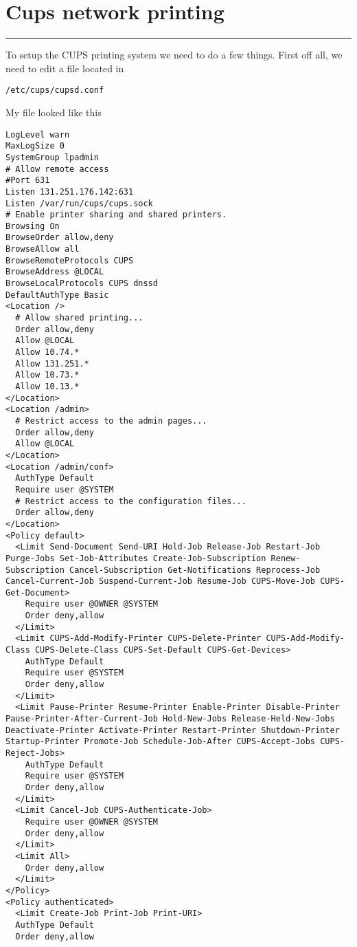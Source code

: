 \documentclass[a4paper, 10pt]{article}
\newcommand{\mytoprule}{\hrule\vspace{4mm}}
\begin{document}
\vspace{10mm}
\section*{Cups network printing}
\mytoprule

To setup the CUPS printing system we need to do a few things. First off all, we need to edit a file located in 
\begin{verbatim}
/etc/cups/cupsd.conf
\end{verbatim}

My file looked like this
\begin{verbatim}
LogLevel warn
MaxLogSize 0
SystemGroup lpadmin
# Allow remote access
#Port 631
Listen 131.251.176.142:631
Listen /var/run/cups/cups.sock
# Enable printer sharing and shared printers.
Browsing On
BrowseOrder allow,deny
BrowseAllow all
BrowseRemoteProtocols CUPS
BrowseAddress @LOCAL
BrowseLocalProtocols CUPS dnssd
DefaultAuthType Basic
<Location />
  # Allow shared printing...
  Order allow,deny
  Allow @LOCAL
  Allow 10.74.*
  Allow 131.251.*
  Allow 10.73.*
  Allow 10.13.*
</Location>
<Location /admin>
  # Restrict access to the admin pages...
  Order allow,deny
  Allow @LOCAL
</Location>
<Location /admin/conf>
  AuthType Default
  Require user @SYSTEM
  # Restrict access to the configuration files...
  Order allow,deny
</Location>
<Policy default>
  <Limit Send-Document Send-URI Hold-Job Release-Job Restart-Job Purge-Jobs Set-Job-Attributes Create-Job-Subscription Renew-Subscription Cancel-Subscription Get-Notifications Reprocess-Job Cancel-Current-Job Suspend-Current-Job Resume-Job CUPS-Move-Job CUPS-Get-Document>
    Require user @OWNER @SYSTEM
    Order deny,allow
  </Limit>
  <Limit CUPS-Add-Modify-Printer CUPS-Delete-Printer CUPS-Add-Modify-Class CUPS-Delete-Class CUPS-Set-Default CUPS-Get-Devices>
    AuthType Default
    Require user @SYSTEM
    Order deny,allow
  </Limit>
  <Limit Pause-Printer Resume-Printer Enable-Printer Disable-Printer Pause-Printer-After-Current-Job Hold-New-Jobs Release-Held-New-Jobs Deactivate-Printer Activate-Printer Restart-Printer Shutdown-Printer Startup-Printer Promote-Job Schedule-Job-After CUPS-Accept-Jobs CUPS-Reject-Jobs>
    AuthType Default
    Require user @SYSTEM
    Order deny,allow
  </Limit>
  <Limit Cancel-Job CUPS-Authenticate-Job>
    Require user @OWNER @SYSTEM
    Order deny,allow
  </Limit>
  <Limit All>
    Order deny,allow
  </Limit>
</Policy>
<Policy authenticated>
  <Limit Create-Job Print-Job Print-URI>
  AuthType Default
  Order deny,allow

\end{verbatim}
\end{document}
